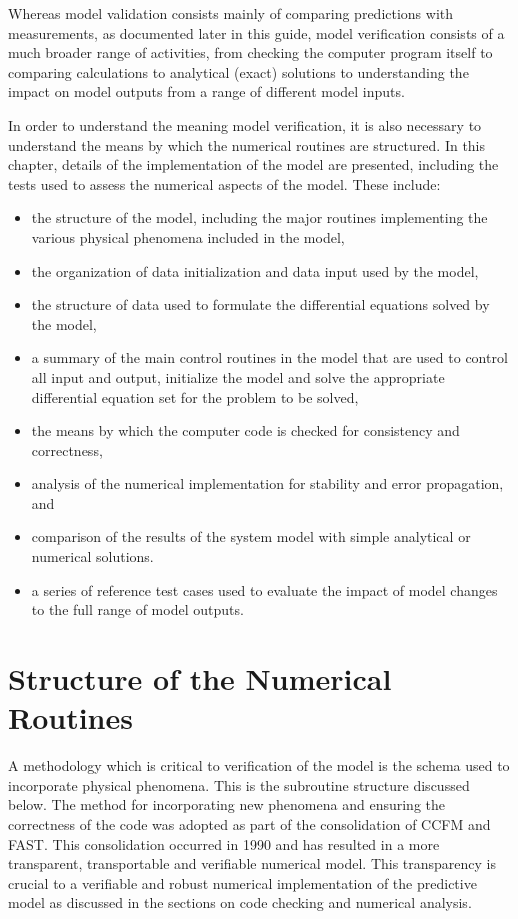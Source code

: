 Whereas model validation consists mainly of comparing predictions with measurements, as documented later in this guide, 
model verification consists of a much broader range of activities, from checking the computer program
itself to comparing calculations to analytical (exact) solutions to understanding the impact on model outputs from a range of different model inputs.

In order to understand the meaning model verification, it is also  necessary to understand the
means by which the numerical routines are structured. In this chapter, details of the
implementation of the model are presented, including the tests used to assess the numerical
aspects of the model. These include:

\begin{itemize}
\item the structure of the model, including the major routines implementing the various
physical phenomena included in the model,
\item the organization of data initialization and data input used by the model,
\item the structure of data used to formulate the differential equations solved by the model,
\item a summary of the main control routines in the model that are used to control all input and
output, initialize the model and solve the appropriate differential equation set for the
problem to be solved,
\item the means by which the computer code is checked for consistency and correctness,
\item analysis of the numerical implementation for stability and error propagation, and
\item comparison of the results of the system model with simple analytical or numerical
solutions.
\item a series of reference test cases used to evaluate the impact of model changes to the full range of model outputs.
\end{itemize}

\section{Structure of the Numerical Routines}

A methodology which is critical to verification of the model is the schema used to incorporate
physical phenomena. This is the subroutine structure discussed below. The method for
incorporating new phenomena and ensuring the correctness of the code was adopted as part of
the consolidation of CCFM and FAST. This consolidation occurred in 1990 and has resulted in a
more transparent, transportable and verifiable numerical model. This transparency is crucial to a
verifiable and robust numerical implementation of the predictive model as discussed in the
sections on code checking and numerical analysis.

